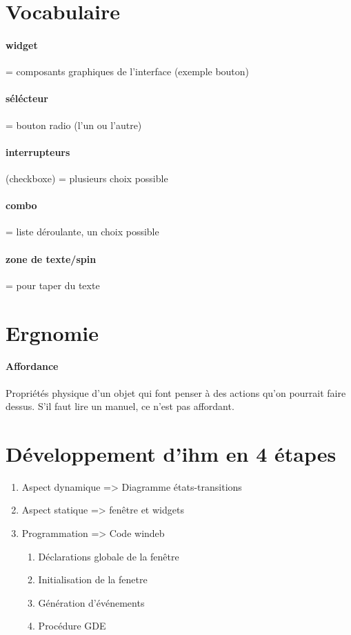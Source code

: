 \documentclass[12pt,a4paper,openany]{report}
\begin{document}
	\maketitle
	\section{Vocabulaire}
	\paragraph{widget} = composants graphiques de l'interface (exemple bouton)
	\paragraph{sélécteur} = bouton radio (l'un ou l'autre)
	\paragraph{interrupteurs} (checkboxe) = plusieurs choix possible
	\paragraph{combo} = liste déroulante, un choix possible
	\paragraph{zone de texte/spin} = pour taper du texte
	\section{Ergnomie}
	\paragraph{Affordance} Propriétés physique d'un objet qui font penser à des actions qu'on pourrait faire dessus.
	S'il faut lire un manuel, ce n'est pas affordant. 
	\section{Développement d'ihm en 4 étapes}
	\begin{enumerate}
		\item Aspect dynamique => Diagramme états-transitions
		\item Aspect statique => fenêtre et widgets
		\item Programmation => Code windeb
		\begin{enumerate}
			\item Déclarations globale de la fenêtre
			\item Initialisation de la fenetre
			\item  Génération d'événements
			\item  Procédure GDE
		\end{enumerate}
	\end{enumerate}
\end{document}
